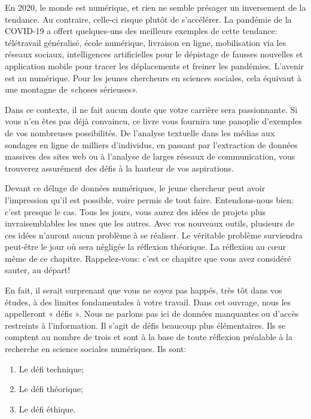 \documentclass[
  letterpaper,
]{scrbook}
\providecommand{\tightlist}{%
  \setlength{\itemsep}{0pt}\setlength{\parskip}{0pt}}\usepackage{longtable,booktabs,array}
\begin{document}
En 2020, le monde est numérique, et rien ne semble présager un
inversement de la tendance. Au contraire, celle-ci risque plutôt de
s'accélérer. La pandémie de la COVID-19 a offert quelques-uns des
meilleurs exemples de cette tendance: télétravail généralisé, école
numérique, livraison en ligne, mobilisation via les réseaux sociaux,
intelligences artificielles pour le dépistage de fausses nouvelles et
application mobile pour tracer les déplacements et freiner les
pandémies. L'avenir est au numérique. Pour les jeunes chercheurs en
sciences sociales, cela équivaut à une montagne de «choses sérieuses».

Dans ce contexte, il ne fait aucun doute que votre carrière sera
passionnante. Si vous n'en êtes pas déjà convaincu, ce livre vous
fournira une panoplie d'exemples de vos nombreuses possibilités. De
l'analyse textuelle dans les médias aux sondages en ligne de milliers
d'individus, en passant par l'extraction de données massives des sites
web ou à l'analyse de larges réseaux de communication, vous trouverez
assurément des défis à la hauteur de vos aspirations.

Devant ce déluge de données numériques, le jeune chercheur peut avoir
l'impression qu'il est possible, voire permis de tout faire.
Entendons-nous bien: c'est presque le cas. Tous les jours, vous aurez
des idées de projets plus invraisemblables les unes que les autres. Avec
vos nouveaux outils, plusieurs de ces idées n'auront aucun problème à se
réaliser. Le véritable problème surviendra peut-être le jour où sera
négligée la réflexion théorique. La réflexion au cœur même de ce
chapitre. Rappelez-vous: c'est ce chapitre que vous avez considéré
sauter, au départ!

En fait, il serait surprenant que vous ne soyez pas happés, très tôt
dans vos études, à des limites fondamentales à votre travail. Dans cet
ouvrage, nous les appelleront « défis ». Nous ne parlons pas ici de
données manquantes ou d'accès restreints à l'information. Il s'agit de
défis beaucoup plus élémentaires. Ils se comptent au nombre de trois et
sont à la base de toute réflexion préalable à la recherche en science
sociales numériques. Ils sont:

\begin{enumerate}
\def\labelenumi{\arabic{enumi}.}
\tightlist
\item
  Le défi technique;
\item
  Le défi théorique;
\item
  Le défi éthique.
\end{enumerate}
\end{document}
